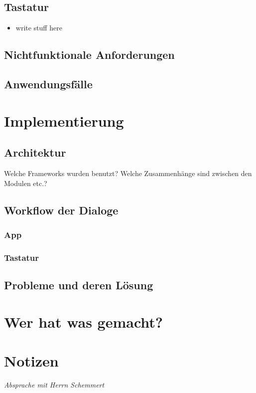 \documentclass[11pt]{article}
\begin{document}
		\subsection{Tastatur}
		\begin{itemize}
			\item write stuff here
		\end{itemize}
	
	\subsection{Nichtfunktionale Anforderungen}
	\subsection{Anwendungsfälle}


\section{Implementierung}
	\subsection{Architektur}
		Welche Frameworks wurden benutzt? Welche Zusammenhänge sind zwischen den Modulen etc.?
	\subsection{Workflow der Dialoge}
		\subsubsection{App}
		\subsubsection{Tastatur}

	\subsection{Probleme und deren Lösung}

\section{Wer hat was gemacht?}
\section{Notizen}
	\emph{Absprache mit Herrn Schemmert}
	
\end{document}
